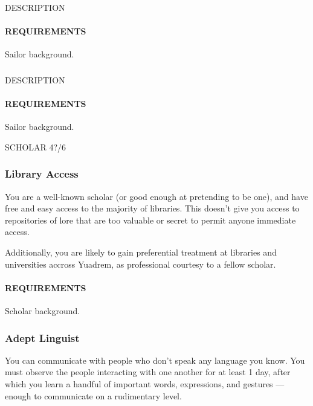     \subsubsection{} \label{feat::NAME}
    DESCRIPTION
    \paragraph{REQUIREMENTS} Sailor background.

    \subsubsection{} \label{feat::NAME}
    DESCRIPTION
    \paragraph{REQUIREMENTS} Sailor background.

SCHOLAR 4?/6
    \subsubsection{Library Access} \label{feat::libraryaccess}
    You are a well-known scholar (or good enough at pretending to be one), and have free and easy access to the majority of libraries.
    This doesn't give you access to repositories of lore that are too valuable or secret to permit anyone immediate access.

    Additionally, you are likely to gain preferential treatment at libraries and universities accross Yuadrem, as professional courtesy to a fellow scholar.
    \paragraph{REQUIREMENTS} Scholar background.

    \subsubsection{Adept Linguist} \label{feat::adeptlinguist}
    You can communicate with people who don't speak any language you know.
    You must observe the people interacting with one another for at least 1 day, after which you learn a handful of important words, expressions, and gestures --- enough to communicate on a rudimentary level.
